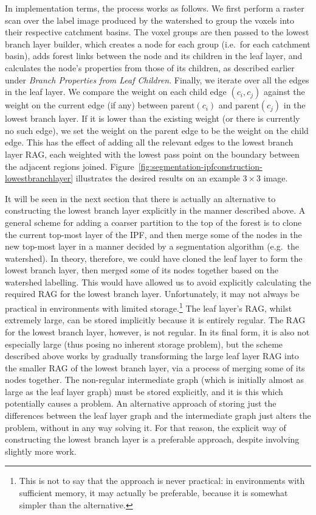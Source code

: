 In implementation terms, the process works as follows. We first perform a raster scan over the label image produced by the watershed to group the voxels into their respective catchment basins. The voxel groups are then passed to the lowest branch layer builder, which creates a node for each group (i.e.~for each catchment basin), adds forest links between the node and its children in the leaf layer, and calculates the node's properties from those of its children, as described earlier under \emph{Branch Properties from Leaf Children}. Finally, we iterate over all the edges in the leaf layer. We compare the weight on each child edge $(c_i,c_j)$ against the weight on the current edge (if any) between $\mbox{parent}(c_i)$ and $\mbox{parent}(c_j)$ in the lowest branch layer. If it is lower than the existing weight (or there is currently no such edge), we set the weight on the parent edge to be the weight on the child edge. This has the effect of adding all the relevant edges to the lowest branch layer RAG, each weighted with the lowest pass point on the boundary between the adjacent regions joined. Figure~\ref{fig:segmentation-ipfconstruction-lowestbranchlayer} illustrates the desired results on an example $3 \times 3$ image.

It will be seen in the next section that there is actually an alternative to constructing the lowest branch layer explicitly in the manner described above. A general scheme for adding a coarser partition to the top of the forest is to clone the current top-most layer of the IPF, and then merge some of the nodes in the new top-most layer in a manner decided by a segmentation algorithm (e.g.~the watershed). In theory, therefore, we could have cloned the leaf layer to form the lowest branch layer, then merged some of its nodes together based on the watershed labelling. This would have allowed us to avoid explicitly calculating the required RAG for the lowest branch layer. Unfortunately, it may not always be practical in environments with limited storage.\footnote{This is not to say that the approach is never practical: in environments with sufficient memory, it may actually be preferable, because it is somewhat simpler than the alternative.} The leaf layer's RAG, whilst extremely large, can be stored implicitly because it is entirely regular. The RAG for the lowest branch layer, however, is not regular. In its final form, it is also not especially large (thus posing no inherent storage problem), but the scheme described above works by gradually transforming the large leaf layer RAG into the smaller RAG of the lowest branch layer, via a process of merging some of its nodes together. The non-regular intermediate graph (which is initially almost as large as the leaf layer graph) must be stored explicitly, and it is this which potentially causes a problem. An alternative approach of storing just the differences between the leaf layer graph and the intermediate graph just alters the problem, without in any way solving it. For that reason, the explicit way of constructing the lowest branch layer is a preferable approach, despite involving slightly more work.

